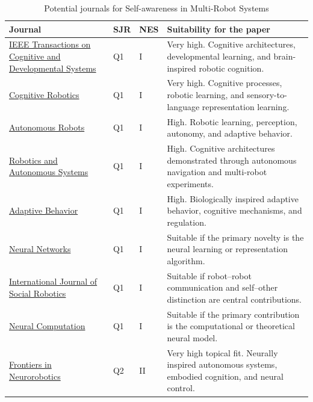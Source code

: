 \documentclass[a4paper]{article}
\begin{document}
      \begin{table}[p]
         \centering

         \caption{Potential journals for Self-awareness in Multi-Robot Systems}
         \label{tab:neurorobotics_journals}

         \begin{tabular}{@{}p{}p{}p{}p{}@{}}
\hline
\textbf{Journal} & \textbf{SJR} & \textbf{NES} & \textbf{Suitability for the paper} \\
\hline
\href{https://cis.ieee.org/publications/t-cognitive-and-developmental-systems}{IEEE Transactions on Cognitive and Developmental Systems} & Q1 & I & Very high. Cognitive architectures, developmental learning, and brain-inspired robotic cognition. \\
\hline
\href{https://www.keaipublishing.com/en/journals/cognitive-robotics/}{Cognitive Robotics} & Q1 & I & Very high. Cognitive processes, robotic learning, and sensory-to-language representation learning. \\
\hline
\href{https://link.springer.com/journal/10514}{Autonomous Robots} & Q1 & I & High. Robotic learning, perception, autonomy, and adaptive behavior. \\
\hline
\href{https://www.sciencedirect.com/journal/robotics-and-autonomous-systems}{Robotics and Autonomous Systems} & Q1 & I & High. Cognitive architectures demonstrated through autonomous navigation and multi-robot experiments. \\
\hline
\href{https://journals.sagepub.com/home/adb}{Adaptive Behavior} & Q1 & I & High. Biologically inspired adaptive behavior, cognitive mechanisms, and regulation. \\
\hline
\href{https://www.sciencedirect.com/journal/neural-networks}{Neural Networks} & Q1 & I & Suitable if the primary novelty is the neural learning or representation algorithm. \\
\hline
\href{https://link.springer.com/journal/12369}{International Journal of Social Robotics} & Q1 & I & Suitable if robot--robot communication and self--other distinction are central contributions. \\
\hline
\href{https://direct.mit.edu/neco}{Neural Computation} & Q1 & I & Suitable if the primary contribution is the computational or theoretical neural model. \\
\hline
\href{https://www.frontiersin.org/journals/neurorobotics}{Frontiers in Neurorobotics} & Q2 & II & Very high topical fit. Neurally inspired autonomous systems, embodied cognition, and neural control. \\

\end{tabular}
\end{table}
\end{document}
